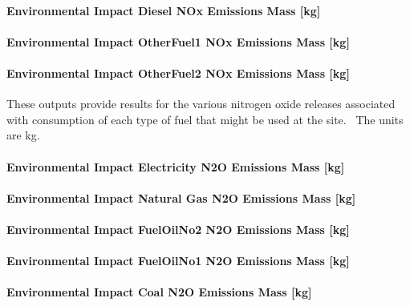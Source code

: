 \paragraph{Environmental Impact Diesel NOx Emissions Mass {[}kg{]}}\label{environmental-impact-diesel-nox-emissions-mass-kg}

\paragraph{Environmental Impact OtherFuel1 NOx Emissions Mass {[}kg{]}}\label{environmental-impact-otherfuel1-nox-emissions-mass-kg}

\paragraph{Environmental Impact OtherFuel2 NOx Emissions Mass {[}kg{]}}\label{environmental-impact-otherfuel2-nox-emissions-mass-kg}

These outputs provide results for the various nitrogen oxide releases associated with consumption of each type of fuel that might be used at the site.~ The units are kg.

\paragraph{Environmental Impact Electricity N2O Emissions Mass {[}kg{]}}\label{environmental-impact-electricity-n2o-emissions-mass-kg}

\paragraph{Environmental Impact Natural Gas N2O Emissions Mass {[}kg{]}}\label{environmental-impact-natural-gas-n2o-emissions-mass-kg}

\paragraph{Environmental Impact FuelOilNo2 N2O Emissions Mass {[}kg{]}}\label{environmental-impact-fuel-oil-2-n2o-emissions-mass-kg}

\paragraph{Environmental Impact FuelOilNo1 N2O Emissions Mass {[}kg{]}}\label{environmental-impact-fuel-oil-1-n2o-emissions-mass-kg}

\paragraph{Environmental Impact Coal N2O Emissions Mass {[}kg{]}}\label{environmental-impact-coal-n2o-emissions-mass-kg}

